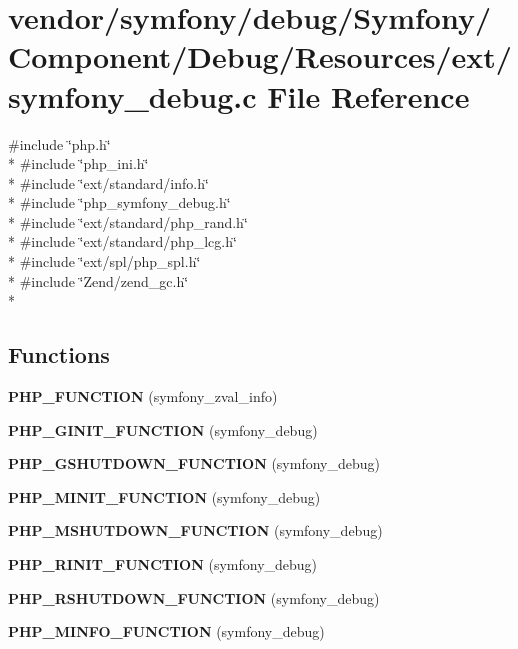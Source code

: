 \section{vendor/symfony/debug/\+Symfony/\+Component/\+Debug/\+Resources/ext/symfony\+\_\+debug.c File Reference}
\label{symfony__debug_8c}
{\ttfamily \#include \char`\"{}php.\+h\char`\"{}}\\*
{\ttfamily \#include \char`\"{}php\+\_\+ini.\+h\char`\"{}}\\*
{\ttfamily \#include \char`\"{}ext/standard/info.\+h\char`\"{}}\\*
{\ttfamily \#include \char`\"{}php\+\_\+symfony\+\_\+debug.\+h\char`\"{}}\\*
{\ttfamily \#include \char`\"{}ext/standard/php\+\_\+rand.\+h\char`\"{}}\\*
{\ttfamily \#include \char`\"{}ext/standard/php\+\_\+lcg.\+h\char`\"{}}\\*
{\ttfamily \#include \char`\"{}ext/spl/php\+\_\+spl.\+h\char`\"{}}\\*
{\ttfamily \#include \char`\"{}Zend/zend\+\_\+gc.\+h\char`\"{}}\\*
\subsection*{Functions}
\begin{DoxyCompactItemize}
\item 
{\bf P\+H\+P\+\_\+\+F\+U\+N\+C\+T\+I\+O\+N} (symfony\+\_\+zval\+\_\+info)
\item 
{\bf P\+H\+P\+\_\+\+G\+I\+N\+I\+T\+\_\+\+F\+U\+N\+C\+T\+I\+O\+N} (symfony\+\_\+debug)
\item 
{\bf P\+H\+P\+\_\+\+G\+S\+H\+U\+T\+D\+O\+W\+N\+\_\+\+F\+U\+N\+C\+T\+I\+O\+N} (symfony\+\_\+debug)
\item 
{\bf P\+H\+P\+\_\+\+M\+I\+N\+I\+T\+\_\+\+F\+U\+N\+C\+T\+I\+O\+N} (symfony\+\_\+debug)
\item 
{\bf P\+H\+P\+\_\+\+M\+S\+H\+U\+T\+D\+O\+W\+N\+\_\+\+F\+U\+N\+C\+T\+I\+O\+N} (symfony\+\_\+debug)
\item 
{\bf P\+H\+P\+\_\+\+R\+I\+N\+I\+T\+\_\+\+F\+U\+N\+C\+T\+I\+O\+N} (symfony\+\_\+debug)
\item 
{\bf P\+H\+P\+\_\+\+R\+S\+H\+U\+T\+D\+O\+W\+N\+\_\+\+F\+U\+N\+C\+T\+I\+O\+N} (symfony\+\_\+debug)
\item 
{\bf P\+H\+P\+\_\+\+M\+I\+N\+F\+O\+\_\+\+F\+U\+N\+C\+T\+I\+O\+N} (symfony\+\_\+debug)
\end{DoxyCompactItemize}
